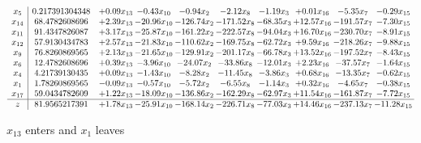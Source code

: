 \documentclass[9pt]{article}
\begin{document}
 \[\begin{array}{c| c c@{\hskip 2pt} c@{\hskip 2pt} c@{\hskip 2pt} c@{\hskip 2pt} c@{\hskip 2pt} c@{\hskip 2pt} c@{\hskip 2pt} c@{\hskip 2pt} }
 x_{5}   &  0.217391304348 & +  0.09 x_{13} & -0.43 x_{10} & -0.94 x_{2} & -2.12 x_{8} & -1.19 x_{3} & +  0.01 x_{16} & -5.35 x_{7} & -0.29 x_{15}\\
 x_{14}   &  68.4782608696 & +  2.39 x_{13} & -20.96 x_{10} & -126.74 x_{2} & -171.52 x_{8} & -68.35 x_{3} & + 12.57 x_{16} & -191.57 x_{7} & -7.30 x_{15}\\
 x_{11}   &  91.4347826087 & +  3.17 x_{13} & -25.87 x_{10} & -161.22 x_{2} & -222.57 x_{8} & -94.04 x_{3} & + 16.70 x_{16} & -230.70 x_{7} & -8.91 x_{15}\\
 x_{12}   &  57.9130434783 & +  2.57 x_{13} & -21.83 x_{10} & -110.62 x_{2} & -169.75 x_{8} & -62.72 x_{3} & +  9.59 x_{16} & -218.26 x_{7} & -9.88 x_{15}\\
 x_{9}   &  76.8260869565 & +  2.13 x_{13} & -21.65 x_{10} & -129.91 x_{2} & -201.17 x_{8} & -66.78 x_{3} & + 13.52 x_{16} & -197.52 x_{7} & -8.43 x_{15}\\
 x_{6}   &  12.4782608696 & +  0.39 x_{13} & -3.96 x_{10} & -24.07 x_{2} & -33.86 x_{8} & -12.01 x_{3} & +  2.23 x_{16} & -37.57 x_{7} & -1.64 x_{15}\\
 x_{4}   &  4.21739130435 & +  0.09 x_{13} & -1.43 x_{10} & -8.28 x_{2} & -11.45 x_{8} & -3.86 x_{3} & +  0.68 x_{16} & -13.35 x_{7} & -0.62 x_{15}\\
 x_{1}   &  1.78260869565 & -0.09 x_{13} & -0.57 x_{10} & -5.72 x_{2} & -6.55 x_{8} & -1.14 x_{3} & +  0.32 x_{16} & -4.65 x_{7} & -0.38 x_{15}\\
 x_{17}   &  59.0434782609 & +  1.22 x_{13} & -18.09 x_{10} & -136.86 x_{2} & -162.29 x_{8} & -62.97 x_{3} & + 11.54 x_{16} & -161.87 x_{7} & -7.72 x_{15}\\
\hline
z    &  81.9565217391 & +  1.78 x_{13} & -25.91 x_{10} & -168.14 x_{2} & -226.71 x_{8} & -77.03 x_{3} & + 14.46 x_{16} & -237.13 x_{7} & -11.28 x_{15}\\
\end{array}\]


 $ x_{13} $ enters and $ x_{1} $ leaves 
\end{document}
